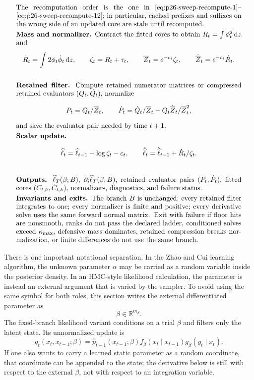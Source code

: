 \documentclass[11pt]{article}
\numberwithin{equation}{section}
\newcommand{\R}{\mathbb R}
\newcommand{\dd}{\,\mathrm d}
\newcommand{\widehatell}{\widehat\ell}
\begin{document}
\begin{equation}
{\begin{array}{p{0.94\linewidth}}
\[\]
The recomputation order is the one in
\eqref{eq:p26-sweep-recompute-1}--\eqref{eq:p26-sweep-recompute-12};
in particular, cached prefixes and suffixes on the wrong side of an updated
core are stale until recomputed.
\\[1mm]
\textbf{Mass and normalizer.}
Contract the fitted cores to obtain \(R_t=\int\phi_t^2\dd z\) and
\[
    \dot R_t=\int 2\phi_t\dot\phi_t\dd z,\qquad
    \zeta_t=R_t+\tau_t,\qquad
    \overline Z_t=e^{-c_t}\zeta_t,\qquad
    \dot{\overline Z}_t=e^{-c_t}\dot R_t.
\]
\\[1mm]
\textbf{Retained filter.}
Compute retained numerator matrices or compressed retained evaluators
\((Q_t,\dot Q_t)\), normalize
\[
    P_t=Q_t/\overline Z_t,\qquad
    \dot P_t=\dot Q_t/\overline Z_t-Q_t\dot{\overline Z}_t/\overline Z_t^2,
\]
and save the evaluator pair needed by time \(t+1\).
\\[1mm]
\textbf{Scalar update.}
\[
    \widehatell_t=\widehatell_{t-1}+\log\zeta_t-c_t,\qquad
    \dot{\widehatell}_t=\dot{\widehatell}_{t-1}
    +\dot R_t/\zeta_t.
\]
\\[1mm]
\textbf{Outputs.}
\(\widehatell_T(\beta;B)\), \(\partial_i\widehatell_T(\beta;B)\),
retained evaluator pairs \((P_t,\dot P_t)\), fitted cores
\((C_{t,k},\dot C_{t,k})\), normalizers, diagnostics, and failure status.
\\[1mm]
\textbf{Invariants and exits.}
The branch \(B\) is unchanged; every retained filter integrates to one; every
normalizer is finite and positive; every derivative solve uses the same
forward normal matrix.  Exit with failure if floor hits are nonsmooth, ranks do
not pass the declared ladder, conditioned solves exceed \(\kappa_{\max}\),
defensive mass dominates, retained compression breaks normalization, or
finite differences do not use the same branch.
\end{array}}
\label{eq:p26-box-deriv-2}
\end{equation}

There is one important notational separation.  In the Zhao and Cui \cite{zhao2024ttsequential} learning
algorithm, the unknown parameter \(\alpha\) may be carried as a random variable
inside the posterior density.  In an HMC-style likelihood calculation, the
parameter is instead an external argument that is varied by the sampler.  To
avoid using the same symbol for both roles, this section writes the external
differentiated parameter as
\[
    \beta\in\R^{m_\beta}.
\]
The fixed-branch likelihood variant conditions on a trial \(\beta\) and filters
only the latent state.  Its unnormalized update is
\[
    q_t(x_t,x_{t-1};\beta)
    =
    \widehat p_{t-1}(x_{t-1};\beta)
    f_\beta(x_t\mid x_{t-1})
    g_\beta(y_t\mid x_t).
\]
If one also wants to carry a learned static parameter as a random coordinate,
that coordinate can be appended to the state; the derivative below is still
with respect to the external \(\beta\), not with respect to an integration
variable.
\end{document}
